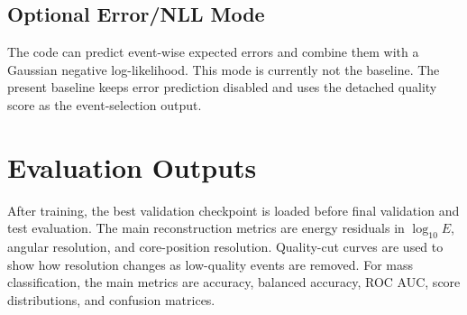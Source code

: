 \documentclass[a4paper,10pt]{article}
\begin{document}
\subsection{Optional Error/NLL Mode}

The code can predict event-wise expected errors and combine them with a Gaussian negative log-likelihood.
This mode is currently not the baseline.
The present baseline keeps error prediction disabled and uses the detached quality score as the event-selection output.

\section{Evaluation Outputs}

After training, the best validation checkpoint is loaded before final validation and test evaluation.
The main reconstruction metrics are energy residuals in $\log_{10}E$, angular resolution, and core-position resolution.
Quality-cut curves are used to show how resolution changes as low-quality events are removed.
For mass classification, the main metrics are accuracy, balanced accuracy, ROC AUC, score distributions, and confusion matrices.
\end{document}
